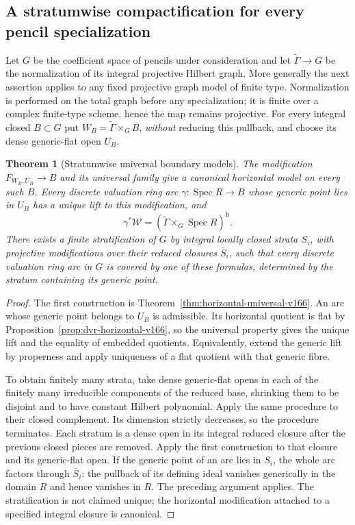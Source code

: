 \documentclass[11pt,reqno]{amsart}
\numberwithin{equation}{section}
\newtheorem{theorem}{Theorem}[section]
\theoremstyle{definition}\newtheorem{definition}[theorem]{Definition}
\theoremstyle{remark}\newtheorem{remark}[theorem]{Remark}
\begin{document}
\subsection{A stratumwise compactification for every pencil specialization}
Let $G$ be the coefficient space of pencils under consideration and
let $\widetilde\Gamma\to G$ be the normalization of its integral
projective Hilbert graph. More generally the next assertion applies
to any fixed projective graph model of finite type. Normalization is
performed on the total graph before any specialization; it is finite
over a complex finite-type scheme, hence the map remains projective.
For every integral closed $B\subset G$ put
$W_B=\widetilde\Gamma\times_G B$, \emph{without} reducing this
pullback, and choose its dense generic-flat open $U_B$.

\begin{theorem}[Stratumwise universal boundary models]
\label{thm:stratum-flattening-v166}
The modification $F_{W_B,U_B}\to B$ and its universal family give a
canonical horizontal model on every such $B$. Every discrete
valuation ring arc $\gamma:\operatorname{Spec}R\to B$ whose generic
point lies in $U_B$ has a unique lift to this modification, and
\begin{equation}\label{eq:arc-universal-v166}
 \gamma^*\mathcal W=(\widetilde\Gamma\times_G\operatorname{Spec}R)^{\mathrm h}.
\end{equation}
There exists a finite stratification of $G$ by integral locally
closed strata $S_i$, with projective modifications over their reduced
closures $\overline S_i$, such that every discrete valuation ring
arc in $G$ is covered by one of these formulas, determined by the
stratum containing its generic point.
\end{theorem}
\begin{proof}
The first construction is Theorem~\ref{thm:horizontal-universal-v166}.
An arc whose generic point belongs to $U_B$ is admissible. Its
horizontal quotient is flat by
Proposition~\ref{prop:dvr-horizontal-v166}, so the universal property
gives the unique lift and the equality of embedded quotients.
Equivalently, extend the generic lift by properness and apply
uniqueness of a flat quotient with that generic fibre.

To obtain finitely many strata, take dense generic-flat opens in
each of the finitely many irreducible components of the reduced
base, shrinking them to be disjoint and to have constant Hilbert
polynomial. Apply the same procedure to their closed complement.
Its dimension strictly decreases, so the procedure terminates. Each
stratum is a dense open in its integral reduced closure after the
previous closed pieces are removed. Apply the first construction
to that closure and its generic-flat open. If the generic point of
an arc lies in $S_i$, the whole arc factors through $\overline S_i$:
the pullback of its defining ideal vanishes generically in the
domain $R$ and hence vanishes in $R$. The preceding argument applies.
The stratification is not claimed unique; the horizontal modification
attached to a specified integral closure is canonical.
\end{proof}
\end{document}

